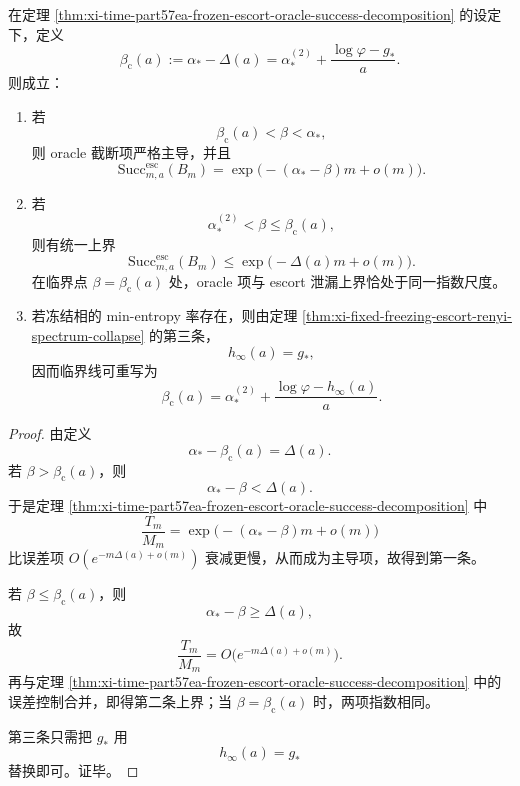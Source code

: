 \begin{theorem}\label{thm:xi-time-part57ea-oracle-escort-critical-line}
在定理 \ref{thm:xi-time-part57ea-frozen-escort-oracle-success-decomposition} 的设定下，定义
\[
\beta_{\mathrm c}(a)
:=
\alpha_*-\Delta(a)
=
\alpha_*^{(2)}+\frac{\log\varphi-g_*}{a}.
\]
则成立：
\begin{enumerate}
  \item 若
  \[
  \beta_{\mathrm c}(a)<\beta<\alpha_*,
  \]
  则 oracle 截断项严格主导，并且
  \[
  \boxed{\;
  \mathrm{Succ}_{m,a}^{\mathrm{esc}}(B_m)
  =
  \exp\!\bigl(-(\alpha_*-\beta)m+o(m)\bigr).\;}
  \]
  \item 若
  \[
  \alpha_*^{(2)}<\beta\le \beta_{\mathrm c}(a),
  \]
  则有统一上界
  \[
  \boxed{\;
  \mathrm{Succ}_{m,a}^{\mathrm{esc}}(B_m)
  \le
  \exp\!\bigl(-\Delta(a)m+o(m)\bigr).\;}
  \]
  在临界点 \(\beta=\beta_{\mathrm c}(a)\) 处，oracle 项与 escort 泄漏上界恰处于同一指数尺度。
  \item 若冻结相的 min-entropy 率存在，则由定理 \ref{thm:xi-fixed-freezing-escort-renyi-spectrum-collapse} 的第三条，
  \[
  h_\infty(a)=g_*,
  \]
  因而临界线可重写为
  \[
  \boxed{\;
  \beta_{\mathrm c}(a)
  =
  \alpha_*^{(2)}+\frac{\log\varphi-h_\infty(a)}{a}.\;}
  \]
\end{enumerate}
\end{theorem}
\begin{proof}
由定义
\[
\alpha_*-\beta_{\mathrm c}(a)=\Delta(a).
\]
若 \(\beta>\beta_{\mathrm c}(a)\)，则
\[
\alpha_*-\beta<\Delta(a).
\]
于是定理 \ref{thm:xi-time-part57ea-frozen-escort-oracle-success-decomposition} 中
\[
\frac{T_m}{M_m}
=
\exp\!\bigl(-(\alpha_*-\beta)m+o(m)\bigr)
\]
比误差项
\(
O(e^{-m\Delta(a)+o(m)})
\)
衰减更慢，从而成为主导项，故得到第一条。

若 \(\beta\le \beta_{\mathrm c}(a)\)，则
\[
\alpha_*-\beta\ge \Delta(a),
\]
故
\[
\frac{T_m}{M_m}
=
O\!\bigl(e^{-m\Delta(a)+o(m)}\bigr).
\]
再与定理 \ref{thm:xi-time-part57ea-frozen-escort-oracle-success-decomposition} 中的误差控制合并，即得第二条上界；当 \(\beta=\beta_{\mathrm c}(a)\) 时，两项指数相同。

第三条只需把 \(g_*\) 用
\[
h_\infty(a)=g_*
\]
替换即可。证毕。
\end{proof}



\endinput

